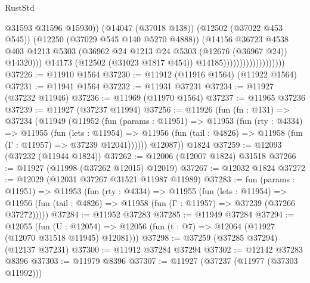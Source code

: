 \begin{lexlean}{RustStd}
\begin{coremodule}
                                                @31593
                                                @31596
                                                @15930))
                                            (@14047 (@37018 @138))
                                            (@12502 (@37022 @453 @545))
                                            (@12250 (@37029 @545 @140 @5270 @4888))
                                            (@14156
                                              @36723
                                              @4538
                                              @403
                                              @1213
                                              @5303
                                              (@36962
                                                @24
                                                @1213
                                                @24
                                                @5303
                                                (@12676 (@36967 @24))
                                                @14320)))
                                          @14173
                                          (@12502 (@31023 @1817 @454))
                                          @14185)))))))))))))))))))
@37226 := @11910 @1564
@37230 := @11912 (@11916 @1564) (@11922 @1564)
@37231 := @11941 @1564
@37232 := @11931 @37231
@37234 := @11927 (@37232 @11946)
@37236 := @11969 (@11970 @1564)
@37237 := @11965 @37236
@37239 := @11927 (@37237 @11994)
@37256 := @11926
    (fun (fn : @131) =>
    @37234
      (@11949
        (@11952
          (fun (params : @11951) =>
          @11953
            (fun (rty : @4334) =>
            @11955
              (fun (lets : @11954) =>
              @11956 (fun (tail : @4826) => @11958 (fun (Γ : @11957) => @37239 @12041))))))
        @12087))
    @1824
@37259 := @12093 (@37232 (@11944 @1824))
@37262 := @12006 (@12007 @1824) @31518
@37266 := @11927 (@11998 (@37262 @12015) @12019)
@37267 := @12032 @1824
@37272 := @12029 (@12031 @37267 @31521 @11987 @11989)
@37283 := fun (params : @11951) =>
  @11953
    (fun (rty : @4334) =>
    @11955
      (fun (lets : @11954) =>
      @11956 (fun (tail : @4826) => @11958 (fun (Γ : @11957) => @37239 (@37266 @37272)))))
@37284 := @11952 @37283
@37285 := @11949 @37284
@37294 := @12055
    (fun (U : @12054) => @12056 (fun (t : @7) => @12064 (@11927 (@12070 @31518 @11945) @12081)))
@37298 := @37259 (@37285 @37294) (@12137 @37231)
@37300 := @11912 @37284 @37294
@37302 := @12142 @37283 @8396
@37303 := @11979 @8396
@37307 := @11927 (@37237 (@11977 (@37303 @11992)))

\end{coremodule}
\end{lexlean}
